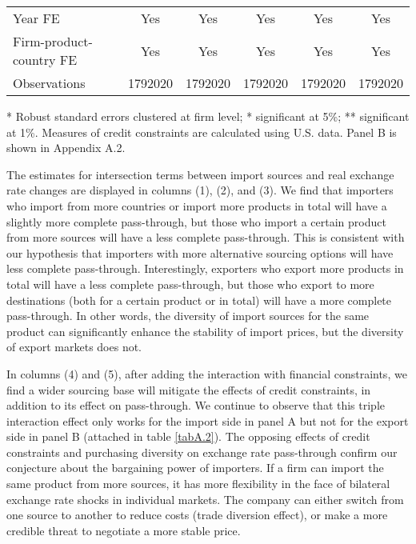 \begin{table}[htbp]
\begin{threeparttable}
\begin{tabular}{lccccc}
		Year FE  & Yes   & Yes   & Yes   & Yes   & Yes \\
		Firm-product-country FE & Yes   & Yes   & Yes   & Yes   & Yes \\
		Observations & 1792020 & 1792020 & 1792020 & 1792020 & 1792020 \\
		\bottomrule
	\end{tabular}
	\begin{tablenotes}
	\footnotesize
	\item[*] Robust standard errors clustered at firm level; * significant at 5\%; ** significant at 1\%. Measures of credit constraints are calculated using U.S. data. Panel B is shown in Appendix A.2.
	\end{tablenotes}
	\end{threeparttable}
	\label{tab5.4}
\end{table}

The estimates for intersection terms between import sources and real exchange rate changes are displayed in columns (1), (2), and (3). We find that importers who import from more countries or import more products in total will have a slightly more complete pass-through, but those who import a certain product from more sources will have a less complete pass-through. This is consistent with our hypothesis that importers with more alternative sourcing options will have less complete pass-through. Interestingly, exporters who export more products in total will have a less complete pass-through, but those who export to more destinations (both for a certain product or in total) will have a more complete pass-through. In other words, the diversity of import sources for the same product can significantly enhance the stability of import prices, but the diversity of export markets does not.

In columns (4) and (5), after adding the interaction with financial constraints, we find a wider sourcing base will mitigate the effects of credit constraints, in addition to its effect on pass-through. We continue to observe that this triple interaction effect only works for the import side in panel A but not for the export side in panel B (attached in table \ref{tabA.2}). The opposing effects of credit constraints and purchasing diversity on exchange rate pass-through confirm our conjecture about the bargaining power of importers. If a firm can import the same product from more sources, it has more flexibility in the face of bilateral exchange rate shocks in individual markets. The company can either switch from one source to another to reduce costs (trade diversion effect), or make a more credible threat to negotiate a more stable price.


